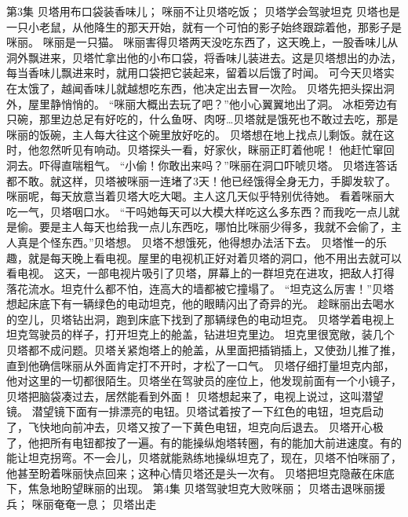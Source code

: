 \documentclass[a4paper,12pt,UTF8,twoside]{ctexbook}
\begin{document}
    第3集 
        贝塔用布口袋装香味儿； 
        咪丽不让贝塔吃饭； 
        贝塔学会驾驶坦克   
        贝塔也是一只小老鼠，从他降生的那天开始，就有一个可怕的影子始终跟踪着他，那影子是咪丽。 
        咪丽是一只猫。 
        咪丽害得贝塔两天没吃东西了，这天晚上，一股香味儿从洞外飘进来，贝塔忙拿出他的小布口袋，将香味儿装进去。这是贝塔想出的办法，每当香味儿飘进来时，就用口袋把它装起来，留着以后饿了时闻。 
        可今天贝塔实在太饿了，越闻香味儿就越想吃东西，他决定出去冒一次险。 
        贝塔先把头探出洞外，屋里静悄悄的。 
        “咪丽大概出去玩了吧？”他小心翼翼地出了洞。 
        冰柜旁边有只碗，那里边总足有好吃的，什么鱼呀、肉呀…贝塔就是饿死也不敢过去吃，那是咪丽的饭碗，主人每大往这个碗里放好吃的。 
        贝塔想在地上找点儿剩饭。就在这时，他忽然听见有响动。贝塔探头一看，好家伙，眯丽正盯着他呢！ 
        他赶忙窜回洞去。吓得直喘粗气。 
        “小偷！你敢出来吗？”咪丽在洞口吓唬贝塔。 
        贝塔连答话都不敢。就这样，贝塔被咪丽一连堵了3天！他已经饿得全身无力，手脚发软了。 
        咪丽呢，每天放意当着贝塔大吃大喝。主人这几天似乎特别优待她。 
        看着咪丽大吃一气，贝塔咽口水。 
        “干吗她每天可以大模大样吃这么多东西？而我吃一点儿就是偷。要是主人每天也给我一点儿东西吃，哪怕比咪丽少得多，我就不会偷了，主人真是个怪东西。”贝塔想。 
        贝塔不想饿死，他得想办法活下去。 
        贝塔惟一的乐趣，就是每天晚上看电视。屋里的电视机正好对着贝塔的洞口，他不用出去就可以看电视。 
        这天，一部电视片吸引了贝塔，屏幕上的一群坦克在进攻，把敌人打得落花流水。坦克什么都不怕，连高大的墙都被它撞塌了。 
        “坦克这么厉害！”贝塔想起床底下有一辆绿色的电动坦克，他的眼睛闪出了奇异的光。 
        趁眯丽出去喝水的空儿，贝塔钻出洞，跑到床底下找到了那辆绿色的电动坦克。 
        贝塔学着电视上坦克驾驶员的样子，打开坦克上的舱盖，钻进坦克里边。 
        坦克里很宽敞，装几个贝塔都不成问题。贝塔关紧炮塔上的舱盖，从里面把插销插上，又使劲儿推了推，直到他确信咪丽从外面肯定打不开时，才松了一口气。 
        贝塔仔细打量坦克内部，他对这里的一切都很陌生。贝塔坐在驾驶员的座位上，他发现前面有一个小镜子，贝塔把脑袋凑过去，居然能看到外面！ 
        贝塔想起来了，电视上说过，这叫潜望镜。 
        潜望镜下面有一排漂亮的电钮。贝塔试着按了一下红色的电钮，坦克启动了，飞快地向前冲去，贝塔又按了一下黄色电钮，坦克向后退去。 
        贝塔开心极了，他把所有电钮都按了一遍。有的能操纵炮塔转圈，有的能加大前进速度。有的能让坦克拐弯。不一会儿，贝塔就能熟练地操纵坦克了，现在，贝塔不怕咪丽了，他甚至盼着咪丽快点回来；这种心情贝塔还是头一次有。 
        贝塔把坦克隐蔽在床底下，焦急地盼望眯丽的出现。   第4集 
        贝塔驾驶坦克大败咪丽； 
        贝塔击退咪丽援兵； 
        咪丽奄奄一息； 
        贝塔出走   
\end{document}
